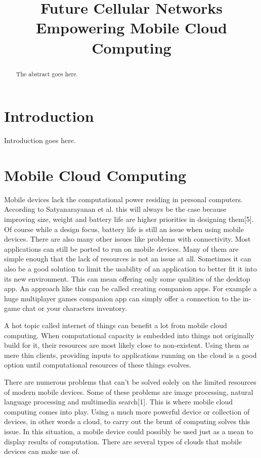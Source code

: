 \documentclass[conference]{IEEEtran}
\begin{document}
\title{Future Cellular Networks Empowering Mobile Cloud Computing}

\author{
}

\maketitle

\begin{abstract}
The abstract goes here.
\end{abstract}

\section{Introduction}
Introduction goes here.

\section{Mobile Cloud Computing}
Mobile devices lack the computational power residing in personal computers. According to Satyanarayanan et al. this will always be the case because improving size, weight and battery life are higher priorities in designing them[5]. Of course while a design focus, battery life is still an issue when using mobile devices. There are also many other issues like problems with connectivity. Most applications can still be ported to run on mobile devices. Many of them are simple enough that the lack of resources is not an issue at all. Sometimes it can also be a good solution to limit the usability of an application to better fit it into its new environment. This can mean offering only some qualities of the desktop app. An approach like this can be called creating companion apps. For example a huge multiplayer games companion app can simply offer a connection to the in-game chat or your characters inventory.
\par
A hot topic called internet of things can benefit a lot from mobile cloud computing. When computational capacity is embedded into things not originally build for it, their resources are most likely close to non-existent. Using them as mere thin clients, providing inputs to applications running on the cloud is a good option until computational resources of these things evolves.
\par
There are numerous problems that can't be solved solely on the limited resources of modern mobile devices. Some of these problems are image processing, natural language processing and multimedia search[1]. This is where mobile cloud computing comes into play. Using a much more powerful device or collection of devices, in other words a cloud, to carry out the brunt of computing solves this issue. In this situation, a mobile device could possibly be used just as a mean to display results of computation. There are several types of clouds that mobile devices can make use of.\\
\end{document}
